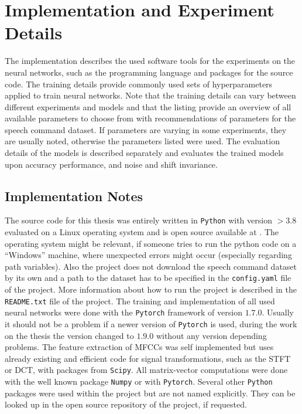 
\section{Implementation and Experiment Details}\label{sec:exp_details}
The implementation describes the used software tools for the experiments on the neural networks, such as the programming language and packages for the source code.
The training details provide commonly used sets of hyperparameters applied to train neural networks.
Note that the training details can vary between different experiments and models and that the listing provide an overview of all available parameters to choose from with recommendations of parameters for the speech command dataset.
If parameters are varying in some experiments, they are usually noted, otherwise the parameters listed were used.
The evaluation details of the models is described separately and evaluates the trained models upon accuracy performance, and noise and shift invariance.



\subsection{Implementation Notes}\label{sec:exp_details_implementation}
The source code for this thesis was entirely written in \texttt{Python} with version $>3.8$ evaluated on a Linux operating system and is open source available at \cite{KWSGame}.
The operating system might be relevant, if someone tries to run the python code on a \enquote{Windows} machine, where unexpected errors might occur (especially regarding path variables).
Also the project does not download the speech command dataset by its own and a path to the dataset has to be specified in the \texttt{config.yaml} file of the project.
More information about how to run the project is described in the \texttt{README.txt} file of the project.
The training and implementation of all used neural networks were done with the \texttt{Pytorch} \cite{Pytorch} framework of version $1.7.0$. 
Usually it should not be a problem if a newer version of \texttt{Pytorch} is used, during the work on the thesis the version changed to $1.9.0$ without any version depending problems.
The feature extraction of MFCCs was self implemented but uses already existing and efficient code for signal transformations, such as the STFT or DCT, with packages from \texttt{Scipy}.
All matrix-vector computations were done with the well known package \texttt{Numpy} or with \texttt{Pytorch}.
Several other \texttt{Python} packages were used within the project but are not named explicitly.
They can be looked up in the open source repository of the project, if requested.


